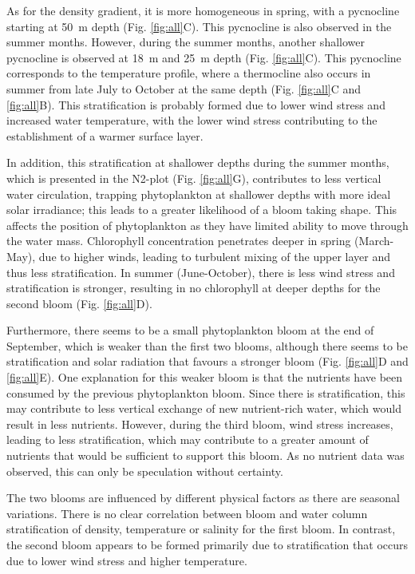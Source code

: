 \documentclass[../Main.tex]{subfiles}
\begin{document}
As for the density gradient, it is more homogeneous in spring, with a pycnocline starting at \SI{50}{m} depth (Fig. \ref{fig:all}C). This pycnocline is also observed in the summer months. However, during the summer months, another shallower pycnocline is observed at \SI{18}{m} and \SI{25}{m} depth (Fig. \ref{fig:all}C). This pycnocline corresponds to the temperature profile, where a thermocline also occurs in summer from late July to October at the same depth (Fig. \ref{fig:all}C and \ref{fig:all}B). This stratification is probably formed due to lower wind stress and increased water temperature, with the lower wind stress contributing to the establishment of a warmer surface layer\supercite{carey2012eco}.

In addition, this stratification at shallower depths during the summer months, which is presented in the N2-plot (Fig. \ref{fig:all}G), contributes to less vertical water circulation, trapping phytoplankton at shallower depths with more ideal solar irradiance; this leads to a greater likelihood of a bloom taking shape. This affects the position of phytoplankton as they have limited ability to move through the water mass\supercite{kase2018phytoplankton}.
Chlorophyll concentration penetrates deeper in spring (March-May), due to higher winds, leading to turbulent mixing of the upper layer and thus less stratification. In summer (June-October), there is less wind stress and stratification is stronger, resulting in no chlorophyll at deeper depths for the second bloom (Fig. \ref{fig:all}D).

Furthermore, there seems to be a small phytoplankton bloom at the end of September, which is weaker than the first two blooms, although there seems to be stratification and solar radiation that favours a stronger bloom (Fig. \ref{fig:all}D and \ref{fig:all}E). One explanation for this weaker bloom is that the nutrients have been consumed by the previous phytoplankton bloom. Since there is stratification, this may contribute to less vertical exchange of new nutrient-rich water, which would result in less nutrients. However, during the third bloom, wind stress increases, leading to less stratification, which may contribute to a greater amount of nutrients that would be sufficient to support this bloom.  As no nutrient data was observed, this can only be speculation without certainty. 

The two blooms are influenced by different physical factors as there are seasonal variations. There is no clear correlation between bloom and water column stratification of density, temperature or salinity for the first bloom. In contrast, the second bloom appears to be formed primarily due to stratification that occurs due to lower wind stress and higher temperature.



\end{document}
